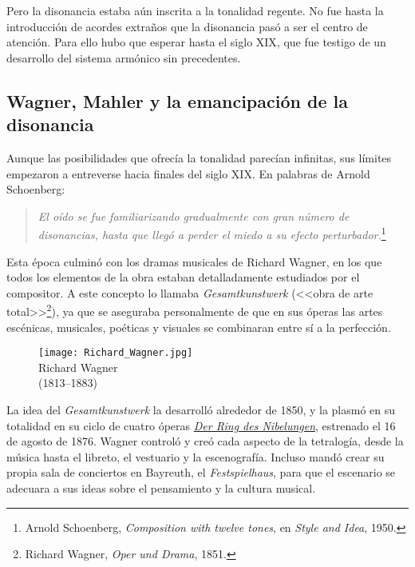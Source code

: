 Pero la disonancia estaba a\'un inscrita a la tonalidad regente. No fue hasta la introducci\'on de acordes extra\~nos que la disonancia pas\'o a ser el centro de atenci\'on. Para ello hubo que esperar hasta el siglo XIX, que fue testigo de un desarrollo del sistema arm\'onico sin precedentes. 

\subsection{Wagner, Mahler y la emancipaci\'on de la disonancia}
Aunque las posibilidades que ofrec\'ia la tonalidad parec\'ian infinitas, sus l\'imites empezaron a entreverse hacia finales del siglo XIX. En palabras de Arnold Schoenberg: 
\begin{quote}
\emph{El o\'ido se fue familiarizando gradualmente con gran n\'umero de disonancias, hasta que lleg\'o a perder el miedo a su efecto perturbador.}\footnote{Arnold Schoenberg, \emph{Composition with twelve tones}, en \emph{Style and Idea}, 1950.}
\end{quote}

Esta \'epoca
culmin\'o con los dramas musicales de Richard Wagner, en los que todos los elementos de la obra estaban detalladamente estudiados por el compositor. A este concepto lo llamaba \emph{Gesamtkunstwerk} (<<{obra de arte total}>>\footnote{Richard Wagner, \emph{Oper und Drama}, 1851.}), ya que %
se aseguraba personalmente de que en sus \'operas las artes esc\'enicas, musicales, po\'eticas y visuales se combinaran entre s\'i a la perfecci\'on.

\begin{figure}
\begin{center}
\texttt{[image: Richard\_Wagner.jpg]}\\
{Richard Wagner\\(1813--1883)}
\end{center}
\end{figure}

La idea del \emph{Gesamtkunstwerk} la desarroll\'o alrededor de 1850, y la plasm\'o en su totalidad en su ciclo de cuatro \'operas \href{https://www.youtube.com/watch?v=1PBhlPeTJ_g}{\textit{Der Ring des Nibelungen}}, estrenado el 16 de agosto de 1876. Wagner control\'o y cre\'o cada aspecto de la tetralog\'ia, desde la m\'usica hasta el libreto, el vestuario y la escenograf\'ia. Incluso mand\'o crear su propia sala de conciertos en Bayreuth, el \emph{Festspielhaus}, para que el escenario se adecuara a sus ideas sobre el pensamiento y la cultura musical.

